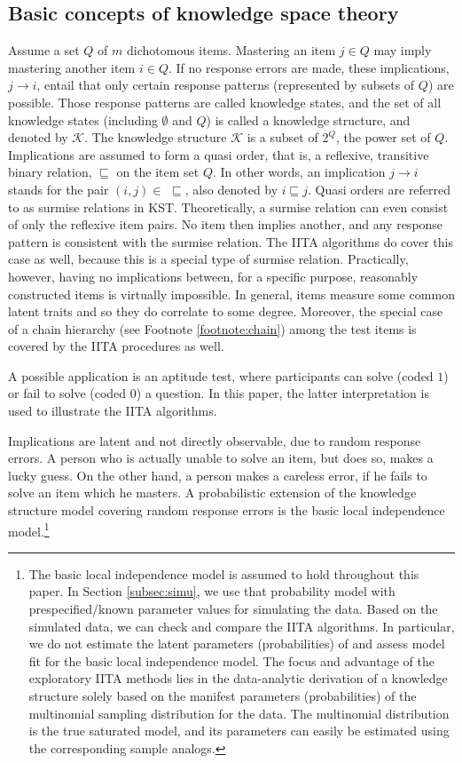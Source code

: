 \documentclass[nojss]{jss}
\begin{document}
\subsection{Basic concepts of knowledge space theory}
\label{subsec:KST}

Assume a set $Q$ of $m$ dichotomous items. Mastering an item $j \in Q$ 
may imply mastering another item $i \in Q$. If no response errors are made, these implications, 
$j \rightarrow i$, entail that only certain response patterns (represented by subsets of $Q$) are possible. Those response patterns are called knowledge states, 
and the set of all knowledge states (including $\emptyset$ and $Q$) is called a knowledge structure, and denoted by $\mathcal{K}$. The knowledge structure
$\mathcal{K}$ is a subset of $2^Q$, the power set of $Q$.
Implications are assumed to form a quasi order, that is, a reflexive, transitive binary relation, $\sqsubseteq$ on the item set $Q$. 
In other words, an implication $j\rightarrow i$ stands for the pair $(i,j)\in \,\,\sqsubseteq$, also denoted by $i\sqsubseteq j$. 
Quasi orders are referred to as surmise relations in KST. 
Theoretically, a surmise relation
can even consist of only the reflexive item pairs. No item then implies another, and any 
response pattern is consistent with the surmise relation. The IITA algorithms do cover this case as well, because this is a special type of surmise relation. Practically, however, having no implications between, for a specific purpose, reasonably constructed items is virtually impossible. 
In general, items measure some common latent traits and so they do correlate to some degree.
Moreover, the special case of a chain hierarchy (see Footnote \ref{footnote:chain}) among the test
items is covered by the IITA procedures as well.

A possible application is an aptitude test, where participants can solve (coded $1$) or fail to solve (coded $0$) a question. 
In this paper, the latter interpretation is used to illustrate the IITA algorithms.

Implications are latent and not directly observable, due to random response errors. A person who is actually unable to solve an item, but does so, makes a lucky guess. On the other hand, a person makes a careless error, if he fails to solve an item which he masters. A probabilistic extension of the knowledge structure model covering random response errors is the basic local independence model.\footnote{\label{foot:blim}The basic local independence model is assumed to hold 
throughout this paper.
In Section \ref{subsec:simu}, we use that probability model with prespecified/known parameter values for simulating the data. Based on the simulated data, we can check and compare the IITA algorithms. In particular, we do not estimate the latent parameters (probabilities) of
and assess model fit for the basic local independence model. The focus and advantage of 
the exploratory IITA methods lies in the data-analytic derivation of a knowledge structure 
solely based on the manifest parameters (probabilities) of the multinomial sampling distribution 
for the data. The multinomial distribution is the true saturated model, and its parameters
can easily be estimated using the corresponding sample analogs.}
\end{document}
